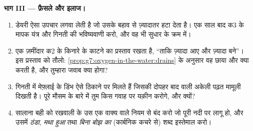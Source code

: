 \begin{problem}[{सप्ताहांत समस्या --- एक नदी, चार ठिकाने, और साल भर
के माप}]
\medskip\noindent\textbf{भाग III --- फ़ैसले और इलाज।}
\begin{enumerate}[resume]
  \item डेयरी ऐसा उपचार लगवा लेती है जो उसके बहाव से ज़्यादातर  हटा देता है। एक साल बाद क3 के मापक यंत्र और गिनती की
        भविष्यवाणी करो, और वह भी सुधार के क्रम में।
  \item एक ज़मींदार क2 के किनारे के  काटने का प्रस्ताव रखता है,
        ``ताकि ज़्यादा  आए और ज़्यादा  बने''। इस प्रस्ताव
        को तौलो: \cref{prop:g7:oxygen-in-the-water:drains} के अनुसार
        वह छाया और क्या करती है, और तुम्हारा जवाब क्या होगा?
  \item गिनती में मेफ़्लाई के डिंभ ऐसे ठिकाने पर मिलते हैं जिसकी दोपहर
        बाद वाली अकेली पढ़त मामूली दिखती है। पूरे मौसम के बारे में तुम
        किस गवाह पर यक़ीन करोगे, और क्यों?
  \item सालाना बही को रखवाली के उस एक वाक्य वाले नियम से बंद करो जो
        पूरी नदी पर लागू हो, और उसमें \emph{ठंडा}, \emph{मथा हुआ} तथा
        \emph{बिना बोझ का} (कार्बनिक कचरे से) शब्द इस्तेमाल करो।
\end{enumerate}
\end{problem}
